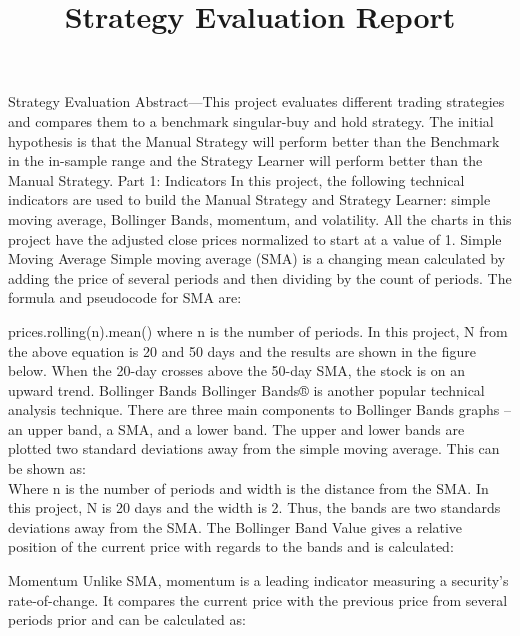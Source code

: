 \documentclass{article}
\begin{document}
\title{Strategy Evaluation Report}
\author{}
\date{}
\maketitle

Strategy Evaluation
Abstract—This project evaluates different trading strategies and compares them to a benchmark singular-buy and hold strategy. The initial hypothesis is that the Manual Strategy will perform better than the Benchmark in the in-sample range and the Strategy Learner will perform better than the Manual Strategy.
Part 1: Indicators
In this project, the following technical indicators are used to build the Manual Strategy and Strategy Learner: simple moving average, Bollinger Bands, momentum, and volatility.
All the charts in this project have the adjusted close prices normalized to start at a value of 1.
Simple Moving Average
Simple moving average (SMA) is a changing mean calculated by adding the price of several periods and then dividing by the count of periods. The formula and pseudocode for SMA are:
 
prices.rolling(n).mean()
where n is the number of periods.
In this project, N from the above equation is 20 and 50 days and the results are shown in the figure below. When the 20-day crosses above the 50-day SMA, the stock is on an upward trend.
Bollinger Bands
Bollinger Bands® is another popular technical analysis technique. There are three main components to Bollinger Bands graphs – an upper band, a SMA, and a lower band. The upper and lower bands are plotted two standard deviations away from the simple moving average. This can be shown as:\\

Where n is the number of periods and width is the distance from the SMA.
In this project, N is 20 days and the width is 2. Thus, the bands are two standards deviations away from the SMA.
The Bollinger Band Value gives a relative position of the current price with regards to the bands and is calculated:
 
Momentum
Unlike SMA, momentum is a leading indicator measuring a security's rate-of-change. It compares the current price with the previous price from several periods prior and can be calculated as:
 
\end{document}
